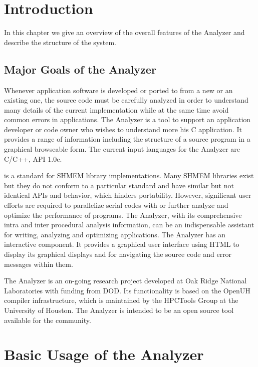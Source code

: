 \section{Introduction}
\label{chapter:introduction}

In this chapter we give an overview of the overall features of the
\openshmem Analyzer and describe the structure of the system.

\subsection{Major Goals of the \openshmem Analyzer}

Whenever application software is developed or ported to \openshmem from
a new or an existing one, the source code must be carefully analyzed
in order to understand many details of the current implementation
while at the same time avoid common errors in \openshmem
applications. The \openshmem Analyzer is a tool to support an
application developer or code owner who wishes to understand more his
C application. It provides a range of information including the
structure of a source program in a graphical browseable form. The
current input languages for the \openshmem Analyzer are C/C++,
\openshmem API 1.0c.

\openshmem is a standard for SHMEM library implementations. Many SHMEM
libraries exist but they do not conform to a particular standard and
have similar but not identical APIs and behavior, which hinders
portability. However, significant user efforts are required to
parallelize serial codes with \openshmem or further analyze and
optimize the performance of \openshmem programs. The \openshmem
Analyzer, with its comprehensive intra and inter procedural analysis
information, can be an indispensable assistant for writing, analyzing
and optimizing \openshmem applications.  The \openshmem Analyzer has an
interactive component. It provides a graphical user interface using
HTML to display its graphical displays and for navigating the source
code and error messages within them.

The \openshmem Analyzer is an on-going research project developed at
Oak Ridge National Laboratories with funding from DOD. Its
functionality is based on the OpenUH compiler infrastructure, which is
maintained by the HPCTools Group at the University of
Houston. The \openshmem Analyzer is intended to be an open source tool
available for the \openshmem community.

\section{Basic Usage of the \openshmem Analyzer}
\label{chapter:basic-usage}

